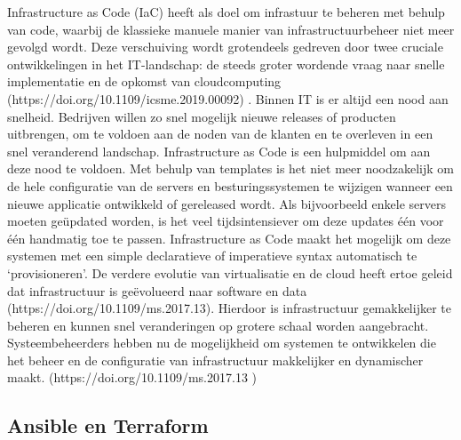 Infrastructure as Code (IaC) heeft als doel om infrastuur te beheren met behulp van code, waarbij de klassieke manuele manier van infrastructuurbeheer niet meer gevolgd wordt. Deze verschuiving wordt grotendeels gedreven door twee cruciale ontwikkelingen in het IT-landschap: de steeds groter wordende vraag naar snelle implementatie en de opkomst van cloudcomputing (https://doi.org/10.1109/icsme.2019.00092) . 
Binnen IT is er altijd een nood aan snelheid. Bedrijven willen zo snel mogelijk nieuwe releases of producten uitbrengen, om te voldoen aan de noden van de klanten en te overleven in een snel veranderend landschap. Infrastructure as Code is een hulpmiddel om aan deze nood te voldoen. Met behulp van templates is het niet meer noodzakelijk om de hele configuratie van de servers en besturingssystemen te wijzigen wanneer een nieuwe applicatie ontwikkeld of gereleased wordt. Als bijvoorbeeld enkele servers moeten geüpdated worden, is het veel tijdsintensiever om deze updates één voor één handmatig toe te passen. Infrastructure as Code maakt het mogelijk om deze systemen met een simple declaratieve of imperatieve syntax automatisch te ‘provisioneren’.
De verdere evolutie van virtualisatie en de cloud heeft ertoe geleid dat infrastructuur is geëvolueerd  naar software en data (https://doi.org/10.1109/ms.2017.13). Hierdoor is infrastructuur gemakkelijker te beheren en kunnen snel veranderingen op grotere schaal worden aangebracht. Systeembeheerders hebben nu de mogelijkheid om systemen te ontwikkelen die het beheer en de configuratie van infrastructuur makkelijker en dynamischer maakt. (https://doi.org/10.1109/ms.2017.13 )

\subsection{Ansible en Terraform}

